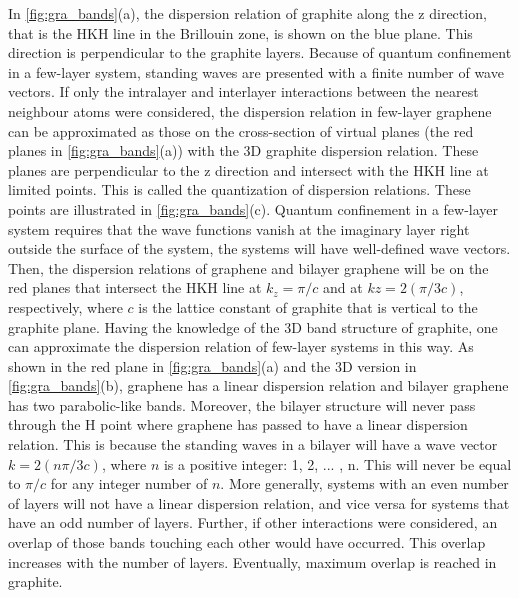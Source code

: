 In \autoref{fig:gra_bands}(a), the dispersion relation of graphite along the z direction, that is the HKH line in the Brillouin zone, is shown on the blue plane. This direction is perpendicular to the graphite layers. Because of quantum confinement in a few-layer system,  standing waves are presented with a finite number of wave vectors.  If only the intralayer and interlayer interactions between the nearest neighbour atoms were considered, the dispersion relation in few-layer graphene can be approximated as those on the cross-section of virtual planes (the red planes in \autoref{fig:gra_bands}(a)) with the 3D graphite dispersion relation.  These planes are perpendicular to the z direction and intersect with the HKH line at limited points. This is called the quantization\footnotemark{} of dispersion relations\cite{saito1998physical}. These points are illustrated in \autoref{fig:gra_bands}(c). Quantum confinement in a few-layer system requires that the wave functions vanish at the imaginary layer right outside the surface of the system, the systems will have well-defined wave vectors. Then, the dispersion relations of graphene and bilayer graphene will be on the red planes that intersect the HKH line at $k_z=\pi/c$ and at $kz=2(\pi/3c)$, respectively, where $c$ is the lattice constant of graphite that is vertical to the graphite plane.  Having the knowledge of the 3D band structure of graphite, one can approximate the dispersion relation of few-layer systems in this way. As shown in the red plane in \autoref{fig:gra_bands}(a) and the 3D version in \autoref{fig:gra_bands}(b), graphene has a linear dispersion relation and bilayer graphene has two parabolic-like bands. Moreover, the bilayer structure will never pass through the H point where graphene has passed to have a linear dispersion relation. This is because the standing waves in a bilayer will have a wave vector $k=2(n \pi/3c)$, where $n$ is a positive integer: 1, 2, ... , n. This will never be equal to $\pi/c$ for any integer number of $n$. More generally, systems with an even number of layers will not have a linear dispersion relation, and vice versa for systems that have an odd number of layers. Further, if other interactions were considered, an overlap of those bands touching each other would have occurred\cite{Partoens2006}. This overlap increases with the number of layers. Eventually, maximum overlap is reached in graphite.


